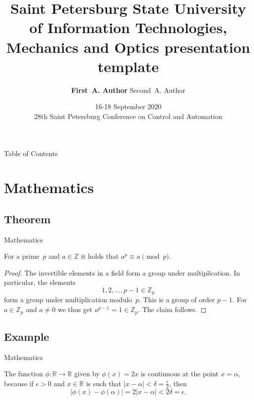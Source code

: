 \documentclass[11pt, aspectratio=169]{beamer}
\title{Saint Petersburg State University of Information Technologies, Mechanics and Optics presentation template}
\author[Author, Another]{
    \hfill
    {\bf First~A. Author}\inst{1}
    \hfill
    Second~A. Author\inst{2}
    \hfill
}
\institute[ITMO University] %
{
    \hfill
    \begin{minipage}[t]{0.4\textwidth}
        \centering{\inst{1}%
        Faculty/Department, ITMO University}
    \end{minipage}
    \hfill
    \begin{minipage}[t]{0.4\textwidth}
        \centering{\inst{2}%
        Faculty/Department, ITMO University}
    \end{minipage}
    \hfill
 }
\date[Occasion]{16-18 September 2020 \\ 28th Saint Petersburg Conference on Control and Automation}
\begin{document}
\frame{\titlepage}

\begin{frame}{Table of Contents}
    \tableofcontents
\end{frame}

\section{Mathematics}
\subsection{Theorem}


\begin{frame}{Mathematics}
    \begin{theorem}
        For a prime~\(p\) and \(a \in \mathbb{Z}\) it holds that \(a^p \equiv a \pmod{p}\).
    \end{theorem}

    \begin{proof}
        The invertible elements in a field form a group under multiplication.
        In particular, the elements
        \begin{equation*}
            1, 2, \ldots, p - 1 \in \mathbb{Z}_p
        \end{equation*}
        form a group under multiplication modulo~\(p\).
        This is a group of order \(p - 1\).
        For \(a \in \mathbb{Z}_p\) and \(a \neq 0\) we thus get \(a^{p-1} = 1 \in \mathbb{Z}_p\).
        The claim follows.
    \end{proof}
\end{frame}


\subsection{Example}


\begin{frame}{Mathematics}
    \begin{example}
        The function \(\phi \colon \mathbb{R} \to \mathbb{R}\) given by \(\phi(x) = 2x\) is continuous at the point \(x = \alpha\),
        because if \(\epsilon > 0\) and \(x \in \mathbb{R}\) is such that \(\lvert x - \alpha \rvert < \delta = \frac{\epsilon}{2}\),
        then
        \begin{equation*}
            \lvert \phi(x) - \phi(\alpha)\rvert = 2\lvert x - \alpha \rvert < 2\delta = \epsilon.
        \end{equation*}
    \end{example}
\end{frame}
\end{document}
